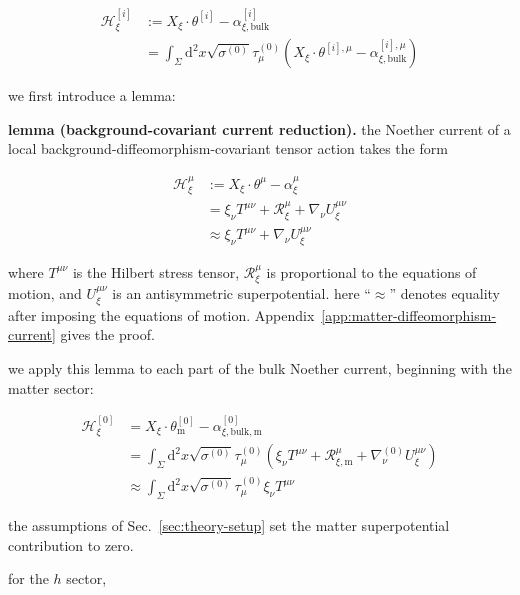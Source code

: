 \begin{align}
\mathcal{H}_{\xi}^{[i]} & := X_{\xi}\cdot \theta ^{[i]}-\alpha _{\xi,\text{bulk}}^{[i]} \\
 & =\int _{\Sigma}\mathrm{d}^{2}x\sqrt{ \sigma ^{(0)} }\tau _{\mu}^{(0)}\left(X_{\xi}\cdot \theta ^{[i],\mu}-\alpha _{\xi,\mathrm{bulk}}^{[i],\mu}\right)
\end{align}

we first introduce a lemma:

\textbf{lemma (background-covariant current reduction).} the Noether current of a local background-diffeomorphism-covariant tensor action takes the form

\begin{align}
\mathcal{H}_{\xi}^{\mu} & :=X_{\xi}\cdot \theta ^{\mu}-\alpha _{\xi}^{\mu} \\
 & =\xi _{\nu}T^{\mu \nu}+\mathcal{R}_{\xi}^{\mu}+\nabla _{\nu}U_{\xi}^{\mu \nu} \\
 & \approx \xi _{\nu}T^{\mu \nu}+\nabla _{\nu}U_{\xi}^{\mu \nu}
\end{align}

where $\displaystyle{T^{\mu \nu}}$ is the Hilbert stress tensor, $\displaystyle{\mathcal{R}_{\xi}^{\mu}}$ is proportional to the equations of motion, and $\displaystyle{U_{\xi}^{\mu \nu}}$ is an antisymmetric superpotential. here ``$\displaystyle{\approx}$'' denotes equality after imposing the equations of motion. Appendix~\ref{app:matter-diffeomorphism-current} gives the proof.

we apply this lemma to each part of the bulk Noether current, beginning with the matter sector:

\begin{align}
\mathcal{H}_{\xi}^{[0]} & =X_{\xi}\cdot \theta ^{[0]}_{\mathrm{m}}-\alpha _{\xi,\mathrm{bulk,m}}^{[0]} \\
 & =\int _{\Sigma}\mathrm{d}^{2}x\sqrt{ \sigma ^{(0)} }\tau _{\mu}^{(0)}(\xi _{\nu}T^{\mu \nu}+\mathcal{R}_{\xi,\mathrm{m}}^{\mu}+\nabla ^{(0)}_{\nu}U_{\xi}^{\mu \nu}) \\
 & \approx \int _{\Sigma}\mathrm{d}^{2}x\sqrt{ \sigma ^{(0)} }\tau _{\mu}^{(0)} \xi _{\nu}T^{\mu \nu}
\end{align}

the assumptions of Sec.~\ref{sec:theory-setup} set the matter superpotential contribution to zero.

for the $\displaystyle{h}$ sector,

